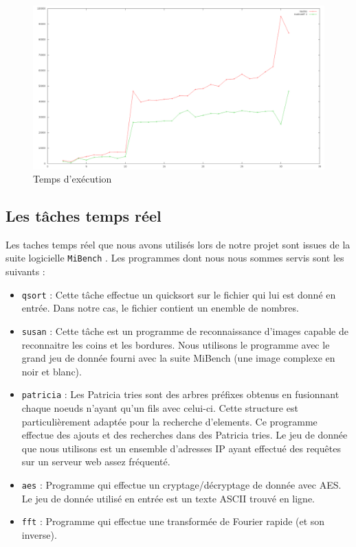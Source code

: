 \begin{figure}[H]
\centering
\includegraphics[scale=0.285]{include/speedup.png}
\caption{Temps d'exécution}
\label{fig:speedup}
\end{figure}

\subsection{Les tâches temps réel}

Les taches temps réel que nous avons utilisés lors de notre projet sont issues 
de la suite logicielle \texttt{MiBench} \cite{guthaus_mibench:_2001}. Les 
programmes dont nous nous sommes servis sont les suivants : 

\begin{itemize}
\renewcommand{\labelitemi}{$\bullet$}
\item \texttt{qsort} : Cette tâche effectue un quicksort sur le fichier qui lui 
est donné en entrée. Dans notre cas, le fichier contient un enemble de nombres.
\item \texttt{susan} : Cette tâche est un programme de reconnaissance d'images 
capable de reconnaitre les coins et les bordures. Nous utilisons le programme 
avec le grand jeu de donnée fourni avec la suite MiBench (une image complexe 
en noir et blanc).
\item \texttt{patricia} : Les Patricia tries sont des arbres préfixes obtenus 
en fusionnant chaque noeuds n'ayant qu'un fils avec celui-ci. Cette structure 
est particulièrement adaptée pour la recherche d'elements. Ce programme effectue
 des ajouts et des recherches dans des Patricia tries. Le jeu de donnée que nous
 utilisons est un ensemble d'adresses IP ayant effectué des requêtes sur un 
serveur web assez fréquenté.
\item \texttt{aes} : Programme qui effectue un cryptage/décryptage de donnée 
avec AES. Le jeu de donnée utilisé en entrée est un texte ASCII trouvé en ligne.
\item \texttt{fft} : Programme qui effectue une transformée de Fourier rapide (et 
son inverse). 
\end{itemize}
